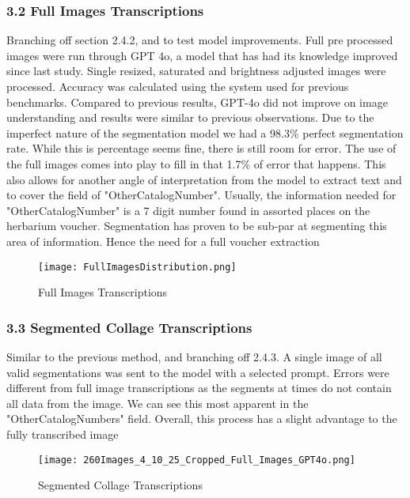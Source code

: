 \documentclass{article}
\begin{document}
\subsubsection*{3.2 Full Images Transcriptions}
Branching off section 2.4.2, and to test model improvements. Full pre processed images were run through GPT 4o, a model that has had its knowledge improved since last study. Single resized, saturated and brightness adjusted images were processed. Accuracy was calculated using the system used for previous benchmarks. Compared to previous results, GPT-4o did not improve on image understanding and results were similar to previous observations. Due to the imperfect nature of the segmentation model we had a 98.3\% perfect segmentation rate. While this is percentage seems fine, there is still room for error. The use of the full images comes into play to fill in that 1.7\% of error that happens. This also allows for another angle of interpretation from the model to extract text and to cover the field of "OtherCatalogNumber". Usually, the information needed for "OtherCatalogNumber" is a 7 digit number found in assorted places on the herbarium voucher. Segmentation has proven to be sub-par at segmenting this area of information. Hence the need for a full voucher extraction 
\begin{figure}[h!]
    \centering
    \texttt{[image: FullImagesDistribution.png]}
    \caption{Full Images Transcriptions}
    \label{fig:enter-label}
\end{figure}



\subsubsection*{3.3 Segmented Collage Transcriptions}
Similar to the previous method, and branching off 2.4.3. A single image of all valid segmentations was sent to the model with a selected prompt. Errors were different from full image transcriptions as the segments at times do not contain all data from the image. We can see this most apparent in the "OtherCatalogNumbers" field. Overall, this process has a slight advantage to the fully transcribed image

\begin{figure}[h!]
    \centering
    \texttt{[image: 260Images\_4\_10\_25\_Cropped\_Full\_Images\_GPT4o.png]}
    \caption{Segmented Collage Transcriptions}
    \label{fig:enter-label}
\end{figure}
\end{document}

